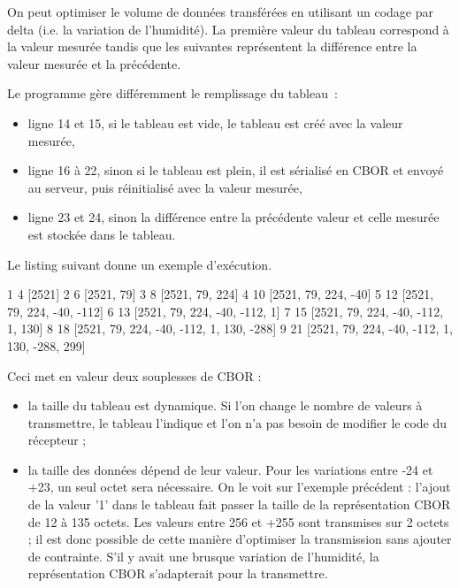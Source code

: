 On peut optimiser le volume de données transférées en utilisant un codage par delta (i.e. la variation de l'humidité). 
La première valeur du tableau correspond à la valeur mesurée tandis que les suivantes représentent la différence entre la valeur mesurée et la précédente.


Le programme  gère différemment le remplissage du tableau~:

\begin{itemize}
    \item ligne 14 et 15, si le tableau est vide, le tableau est créé avec la valeur mesurée,
    \item ligne 16 à 22, sinon si le tableau est plein, il est sérialisé en CBOR et envoyé au serveur, puis réinitialisé avec la valeur mesurée,
    \item ligne 23 et 24, sinon la différence entre la précédente valeur et celle mesurée est stockée dans le tableau.
\end{itemize}

       \vspace{1em}

Le listing suivant donne un exemple d'exécution.

\begin{termc}[backgroundcolor=\color{palerod}, basicstyle=\ttfamily\small, escapechar=\#]
1 4 [2521]
2 6 [2521, 79]
3 8 [2521, 79, 224]
4 10 [2521, 79, 224, -40]
5 12 [2521, 79, 224, -40, -112]
6 13 [2521, 79, 224, -40, -112, 1]
7 15 [2521, 79, 224, -40, -112, 1, 130]
8 18 [2521, 79, 224, -40, -112, 1, 130, -288]
9 21 [2521, 79, 224, -40, -112, 1, 130, -288, 299]
\end{termc}

Ceci met en valeur deux souplesses de CBOR :
\begin{itemize}
    \item la taille du tableau est dynamique. Si l’on change le nombre de valeurs à transmettre, le tableau l’indique et l’on n’a pas besoin de modifier le code du récepteur ;
    \item la taille des données dépend de leur valeur. 
    Pour les variations entre -24 et +23, un seul octet sera nécessaire. 
    On le voit sur l’exemple précédent : l’ajout de la valeur '1' dans le tableau fait passer la taille de la représentation CBOR de 12 à 135 octets. Les valeurs entre 256 et +255 sont transmises sur 2 octets ; il est donc possible de cette manière d’optimiser la transmission sans ajouter de contrainte. S’il y avait une brusque variation de l’humidité, la représentation CBOR s’adapterait pour la transmettre.
\end{itemize}

